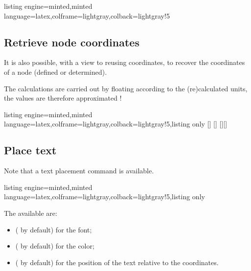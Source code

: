 \documentclass[11pt,a4paper]{ltxdoc}
\begin{document}
\begin{tcblisting}{listing engine=minted,minted language=latex,colframe=lightgray,colback=lightgray!5}
\begin{GraphTikz}[x=1cm,y=1cm,Xmin=0,Ymin=0]
\end{GraphTikz}
\end{tcblisting}

\subsection{Retrieve node coordinates}\label{recupcoordo}

It is also possible, with a view to reusing coordinates, to recover the coordinates of a node (defined or determined).

\smallskip

The calculations are carried out by floating according to the (re)calculated units, the values are therefore approximated !

\begin{tcblisting}{listing engine=minted,minted language=latex,colframe=lightgray,colback=lightgray!5,listing only}
[\macrox]
[\macroy]
[\macrox][\macroy]
\end{tcblisting}

\subsection{Place text}\label{placetxt}

Note that a text placement command is available.

\begin{tcblisting}{listing engine=minted,minted language=latex,colframe=lightgray,colback=lightgray!5,listing only}
\end{tcblisting}

The available \MontreCode{[keys]} are:

\begin{itemize}
	\item {} ( by default) for the font;
	\item {} ( by default) for the color;
	\item {} ( by default) for the position of the text relative to the coordinates.
\end{itemize}
\end{document}
